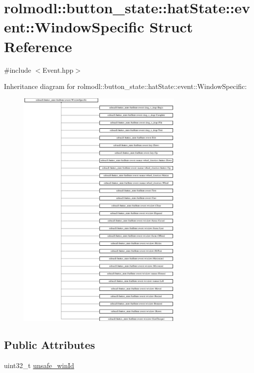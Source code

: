 \hypertarget{structrolmodl_1_1button__state_1_1hat_state_1_1event_1_1_window_specific}{}\section{rolmodl\+::button\+\_\+state\+::hat\+State\+::event\+::Window\+Specific Struct Reference}
\label{structrolmodl_1_1button__state_1_1hat_state_1_1event_1_1_window_specific}


{\ttfamily \#include $<$Event.\+hpp$>$}

Inheritance diagram for rolmodl\+::button\+\_\+state\+::hat\+State\+::event\+::Window\+Specific\+:\begin{figure}[H]
\begin{center}
\leavevmode
\includegraphics[height=12.000000cm]{structrolmodl_1_1button__state_1_1hat_state_1_1event_1_1_window_specific}
\end{center}
\end{figure}
\subsection*{Public Attributes}
\begin{DoxyCompactItemize}
\item 
uint32\+\_\+t \mbox{\hyperlink{structrolmodl_1_1button__state_1_1hat_state_1_1event_1_1_window_specific_abd819e10bb3e44e3236ef55d4d0ab2e9}{unsafe\+\_\+win\+Id}}
\end{DoxyCompactItemize}


